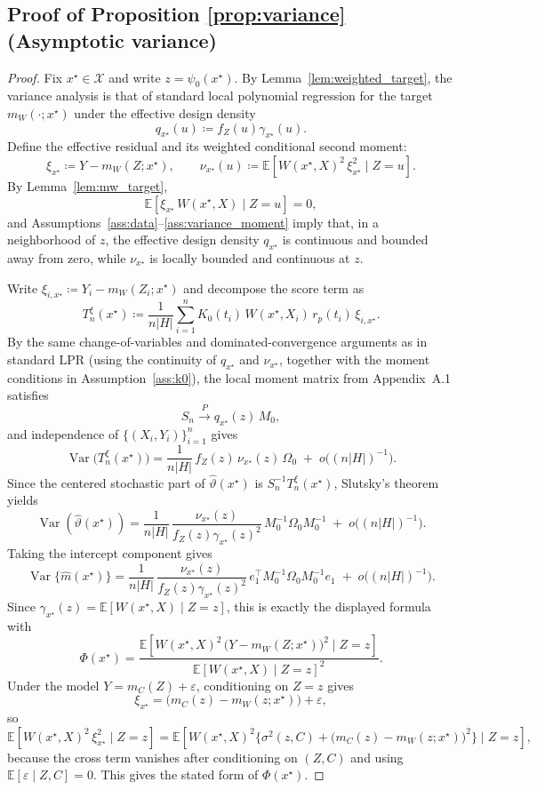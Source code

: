 \documentclass[final,1p,times,authoryear]{elsarticle}
\DeclareMathOperator{\Var}{Var}
\begin{document}
\subsection{Proof of Proposition \ref{prop:variance} (Asymptotic variance)}
\label{app:proof_variance}
\begin{proof}
Fix \(x^\star\in\mathcal{X}\) and write \(z=\psi_0(x^\star)\). By Lemma~\ref{lem:weighted_target}, the variance analysis is that of standard local polynomial regression for the target \(m_W(\cdot;x^\star)\) under the effective design density
\[
q_{x^\star}(u)\coloneqq f_Z(u)\gamma_{x^\star}(u).
\]
Define the effective residual and its weighted conditional second moment:
\[
\xi_{x^\star} \coloneqq Y-m_W(Z;x^\star),
\qquad
\nu_{x^\star}(u)\coloneqq \mathbb{E}\!\left[W(x^\star,X)^2\,\xi_{x^\star}^2\mid Z=u\right].
\]
By Lemma~\ref{lem:mw_target},
\[
\mathbb{E}\!\left[\xi_{x^\star}\,W(x^\star,X)\mid Z=u\right]=0,
\]
and Assumptions~\ref{ass:data}--\ref{ass:variance_moment} imply that, in a neighborhood of \(z\), the effective design density \(q_{x^\star}\) is continuous and bounded away from zero, while \(\nu_{x^\star}\) is locally bounded and continuous at \(z\).

Write \(\xi_{i,x^\star}\coloneqq Y_i-m_W(Z_i;x^\star)\) and decompose the score term as
\[
T_n^\xi(x^\star)\coloneqq \frac{1}{n|H|}\sum_{i=1}^n K_0(t_i)\,W(x^\star,X_i)\,r_p(t_i)\,\xi_{i,x^\star}.
\]
By the same change-of-variables and dominated-convergence arguments as in standard LPR (using the continuity of \(q_{x^\star}\) and \(\nu_{x^\star}\), together with the moment conditions in Assumption~\ref{ass:k0}), the local moment matrix from Appendix~A.1 satisfies
\[
S_n \xrightarrow{P} q_{x^\star}(z)\,M_0,
\]
and independence of \(\{(X_i,Y_i)\}_{i=1}^n\) gives
\[
\Var\!\big(T_n^\xi(x^\star)\big)
=
\frac{1}{n|H|}\,f_Z(z)\,\nu_{x^\star}(z)\,\Omega_0
\;+\;o\!\big((n|H|)^{-1}\big).
\]
Since the centered stochastic part of \(\hat\vartheta(x^\star)\) is \(S_n^{-1}T_n^\xi(x^\star)\), Slutsky's theorem yields
\[
\Var(\hat{\vartheta}(x^\star))
=
\frac{1}{n|H|}\,
\frac{\nu_{x^\star}(z)}{f_Z(z)\gamma_{x^\star}(z)^2}\,
M_0^{-1}\Omega_0M_0^{-1}
 \;+\; o\!\big((n|H|)^{-1}\big).
\]
Taking the intercept component gives
\[
\Var\{\hat m(x^\star)\}
=
\frac{1}{n|H|}\,
\frac{\nu_{x^\star}(z)}{f_Z(z)\gamma_{x^\star}(z)^2}\,
e_1^\top M_0^{-1}\Omega_0M_0^{-1}e_1
\;+\; o\!\big((n|H|)^{-1}\big).
\]
Since \(\gamma_{x^\star}(z)=\mathbb{E}[W(x^\star,X)\mid Z=z]\), this is exactly the displayed formula with
\[
\Phi(x^\star)
=
\frac{\mathbb{E}\!\left[W(x^\star,X)^2\,\big(Y-m_W(Z;x^\star)\big)^2\mid Z=z\right]}
{\mathbb{E}[W(x^\star,X)\mid Z=z]^2}.
\]
Under the model \(Y=m_C(Z)+\varepsilon\), conditioning on \(Z=z\) gives
\[
\xi_{x^\star} = \big(m_C(z)-m_W(z;x^\star)\big)+\varepsilon,
\]
so
\[
\mathbb{E}\!\left[W(x^\star,X)^2\,\xi_{x^\star}^2\mid Z=z\right]
=
\mathbb{E}\!\left[W(x^\star,X)^2\big\{\sigma^2(z,C)+\big(m_C(z)-m_W(z;x^\star)\big)^2\big\}\mid Z=z\right],
\]
because the cross term vanishes after conditioning on \((Z,C)\) and using \(\mathbb{E}[\varepsilon\mid Z,C]=0\). This gives the stated form of \(\Phi(x^\star)\).

\end{proof}
\end{document}
